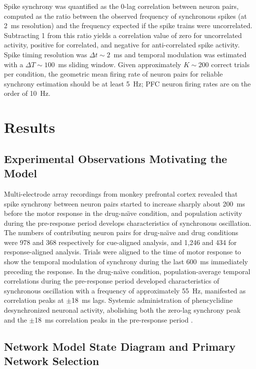 \documentclass[10pt]{article}
\begin{document}
Spike synchrony was quantified as the 0-lag correlation between neuron pairs,
computed as the ratio between the observed frequency of synchronous spikes
(at 2~ms resolution) and the frequency expected if the spike trains were
uncorrelated. Subtracting 1 from this ratio yields a correlation value of
zero for uncorrelated activity, positive for correlated, and negative for
anti-correlated spike activity. Spike timing resolution was
$\Delta t \sim 2$~ms and temporal modulation was estimated with a
$\Delta T \sim 100$~ms sliding window. Given approximately $K \sim 200$
correct trials per condition, the geometric mean firing rate of neuron pairs
for reliable synchrony estimation should be at least 5~Hz; PFC neuron firing
rates are on the order of 10~Hz.

\section{Results}

\subsection{Experimental Observations Motivating the Model}

Multi-electrode array recordings from monkey prefrontal cortex revealed that
spike synchrony between neuron pairs started to increase sharply about
200~ms before the motor response in the drug-na\"{\i}ve condition, and
population activity during the pre-response period develops characteristics
of synchronous oscillation. The numbers of contributing neuron pairs for
drug-na\"{\i}ve and drug conditions were 978 and 368 respectively for
cue-aligned analysis, and 1{,}246 and 434 for response-aligned analysis.
Trials were aligned to the time of motor response to show the temporal
modulation of synchrony during the last 600~ms immediately preceding the
response. In the drug-na\"{\i}ve condition, population-average
temporal correlations during the pre-response period developed characteristics
of synchronous oscillation with a frequency of approximately 55~Hz, manifested
as correlation peaks at $\pm$18~ms lags. Systemic administration of
phencyclidine desynchronized neuronal activity, abolishing both the zero-lag
synchrony peak and the $\pm$18~ms correlation peaks in the pre-response
period \citep{zick2018blocking}.

\subsection{Network Model State Diagram and Primary Network Selection}
\end{document}
